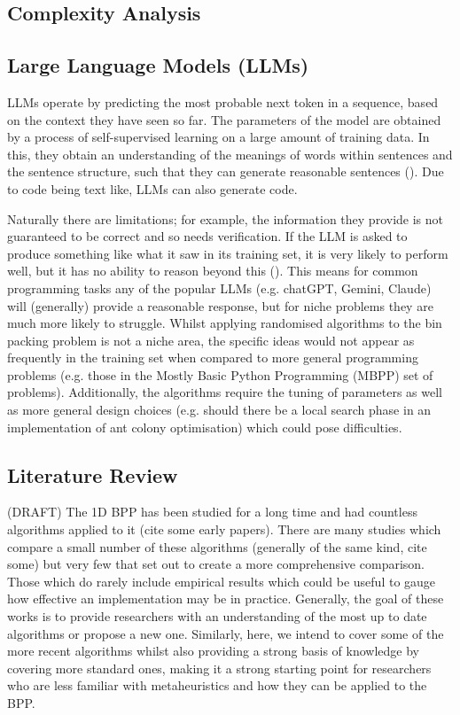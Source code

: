 \documentclass[12pt]{article}
\begin{document}
\subsection{Complexity Analysis}
 
\subsection{Large Language Models (LLMs)}
LLMs operate by predicting the most probable next token in a sequence, based on the context they have seen so far. The parameters of the model are obtained by a process of self-supervised learning on a large amount of training data. In this, they obtain an understanding of the meanings of words within sentences and the sentence structure, such that they can generate reasonable sentences (\cite{stryker}). Due to code being text like, LLMs can also generate code.  

Naturally there are limitations; for example, the information they provide is not guaranteed to be correct and so needs verification. If the LLM is asked to produce something like what it saw in its training set, it is very likely to perform well, but it has no ability to reason beyond this (\cite{kucharavy}). This means for common programming tasks any of the popular LLMs (e.g. chatGPT, Gemini, Claude) will (generally) provide a reasonable response, but for niche problems they are much more likely to struggle. Whilst applying randomised algorithms to the bin packing problem is not a niche area, the specific ideas would not appear as frequently in the training set when compared to more general programming problems (e.g. those in the Mostly Basic Python Programming (MBPP) set of problems). Additionally, the algorithms require the tuning of parameters as well as more general design choices (e.g. should there be a local search phase in an implementation of ant colony optimisation) which could pose difficulties.   

\subsection{Literature Review}
(DRAFT)
The 1D BPP has been studied for a long time and had countless algorithms applied to it (cite some early papers). There are many studies which compare a small number of these algorithms (generally of the same kind, cite some) but very few that set out to create a more comprehensive comparison. Those which do rarely include empirical results which could be useful to gauge how effective an implementation may be in practice. Generally, the goal of these works is to provide researchers with an understanding of the most up to date algorithms or propose a new one. Similarly, here, we intend to cover some of the more recent algorithms whilst also providing a strong basis of knowledge by covering more standard ones, making it a strong starting point for researchers who are less familiar with metaheuristics and how they can be applied to the BPP.  
\end{document}

